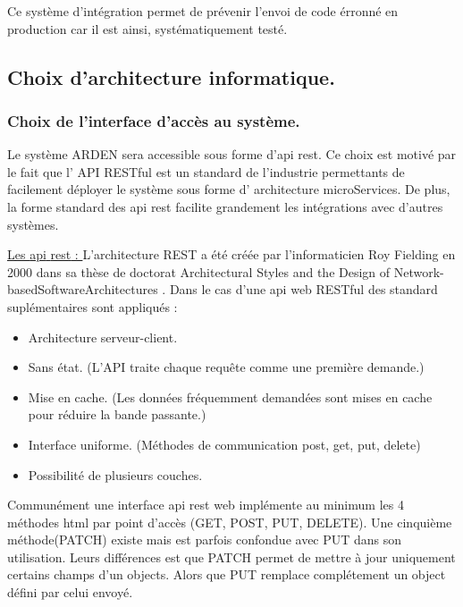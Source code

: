 \justify

Ce système d'intégration permet de prévenir l'envoi de code érronné en production car il est ainsi, systématiquement testé.

\justify
\subsection{Choix d'architecture informatique.}

\subsubsection{Choix de l'interface d'accès au système.}

Le système ARDEN sera accessible sous forme d'\gls{api} \gls{rest}. Ce choix est motivé par le fait que l' API RESTful est un standard de l'industrie permettants de facilement déployer le système sous forme d' architecture microServices. De plus, la forme standard des \gls{api} \gls{rest} facilite grandement les intégrations avec d'autres systèmes.

\begin{minipage}{0.90\textwidth}
 \underline{
  Les \gls{api} \gls{rest} :
 }
 L'architecture REST a été créée par l'informaticien Roy Fielding en 2000 dans sa thèse de doctorat Architectural Styles and the Design of Network-basedSoftwareArchitectures . \cite{REST_theses}
 Dans le cas d'une \gls{api} web RESTful des standard suplémentaires sont appliqués :
 \begin{itemize}
  \item  Architecture serveur-client.
  \item Sans état. (L’API traite chaque requête comme une première demande.)
  \item Mise en cache. (Les données fréquemment demandées sont mises en cache pour réduire la bande passante.)
  \item Interface uniforme. (Méthodes de communication post, get, put, delete)
  \item Possibilité de plusieurs couches.
 \end{itemize}
 Communément une interface \gls{api} \gls{rest} web implémente au minimum les 4 méthodes html par point d'accès (GET, POST, PUT, DELETE). Une cinquième méthode(PATCH) existe mais est parfois confondue avec PUT dans son utilisation. Leurs différences est que PATCH permet de mettre à jour uniquement certains champs d'un objects. Alors que PUT remplace complétement un object défini par celui envoyé.
\end{minipage}

